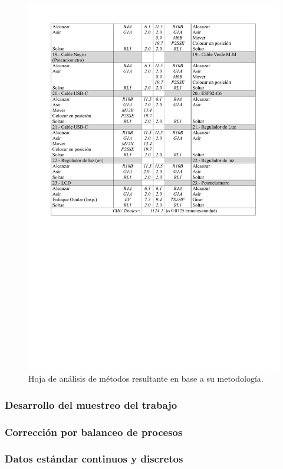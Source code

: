 \begin{figure}[H]
        \includegraphics[scale=0.165]{15/img/tablaMTM1-3.pdf}
        \caption{Hoja de análisis de métodos resultante en base a su  metodología.}
        \label{fig:tablaMTM1-1}
        \end{figure}
    
    \subsubsection{Desarrollo del muestreo del trabajo}
    \subsubsection{Corrección por balanceo de procesos}
    \subsubsection{Datos estándar continuos y discretos}
